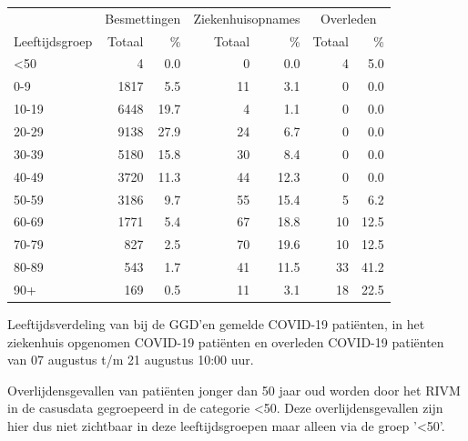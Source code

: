 \documentclass[
  english,
  man,floatsintext]{apa6}
\begin{document}
\begin{table}
\centering\begingroup\fontsize{11}{13}\selectfont

\begin{threeparttable}
\begin{tabular}{lrrrrrr}
\toprule
\multicolumn{1}{c}{ } & \multicolumn{2}{c}{Besmettingen} & \multicolumn{2}{c}{Ziekenhuisopnames} & \multicolumn{2}{c}{Overleden} \\
\cmidrule(l{3pt}r{3pt}){2-3} \cmidrule(l{3pt}r{3pt}){4-5} \cmidrule(l{3pt}r{3pt}){6-7}
Leeftijdsgroep & Totaal & \% & Totaal & \% & Totaal & \%\\
\midrule
<50 & 4 & 0.0 & 0 & 0.0 & 4 & 5.0\\
0-9 & 1817 & 5.5 & 11 & 3.1 & 0 & 0.0\\
10-19 & 6448 & 19.7 & 4 & 1.1 & 0 & 0.0\\
20-29 & 9138 & 27.9 & 24 & 6.7 & 0 & 0.0\\
30-39 & 5180 & 15.8 & 30 & 8.4 & 0 & 0.0\\
40-49 & 3720 & 11.3 & 44 & 12.3 & 0 & 0.0\\
50-59 & 3186 & 9.7 & 55 & 15.4 & 5 & 6.2\\
60-69 & 1771 & 5.4 & 67 & 18.8 & 10 & 12.5\\
70-79 & 827 & 2.5 & 70 & 19.6 & 10 & 12.5\\
80-89 & 543 & 1.7 & 41 & 11.5 & 33 & 41.2\\
90+ & 169 & 0.5 & 11 & 3.1 & 18 & 22.5\\
\bottomrule
\end{tabular}
\begin{tablenotes}
\item[1] Leeftijdsverdeling van bij de GGD’en gemelde COVID-19 patiënten, in het ziekenhuis opgenomen COVID-19 patiënten en overleden COVID-19 patiënten van 07 augustus t/m 21 augustus 10:00 uur.
\item[2] Overlijdensgevallen van patiënten jonger dan 50 jaar oud worden door het RIVM in de casusdata gegroepeerd in de categorie <50. Deze overlijdensgevallen zijn hier dus niet zichtbaar in deze leeftijdsgroepen maar alleen via de groep '<50'.
\end{tablenotes}
\end{threeparttable}
\endgroup{}
\end{table}

\newpage
\end{document}
